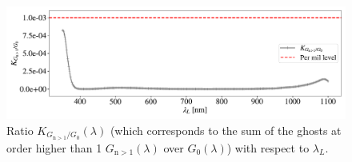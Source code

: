 \begin{figure}
    \centering
    \includegraphics[width=\columnwidth]{fig/ratio_g1_ginf.pdf}
    \caption{Ratio $K_{G_{\mathrm{n}>1}/G_0}(\lambda)$ (which corresponds to the sum of the ghosts at order higher than 1 $G_{\mathrm{n}>1}(\lambda)$ over $G_0(\lambda)$) with respect to $\lambda_L$.}
    \label{fig:ratio_ginf_g0}
\end{figure}


